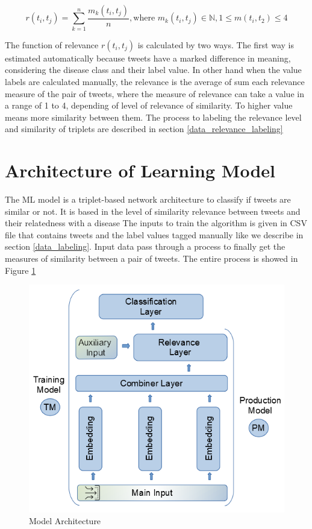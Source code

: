 \documentclass[12pt]{report}
\begin{document}
\begin{equation}
r(t_i, t_j) = \sum^n_{k=1} \frac{m_k(t_i, t_j)}{n}, \text{where } m_k(t_i,t_j) \in \mathbb{N}, 1 \leq m(t_i,t_2) \leq 4
\end{equation}

\noindent The function of relevance $r(t_i, t_j)$ is calculated by two ways. The first way is estimated automatically because tweets have a marked difference in meaning, considering the disease class and their label value. In other hand when the value labels are calculated manually, the relevance is the average of sum each relevance measure of the pair of tweets, where the measure of relevance can take a value in a range of 1 to 4, depending of level of relevance of similarity. To higher value means more similarity between them. The process to labeling the relevance level and similarity of triplets are described in section \ref{data_relevance_labeling}

\section{Architecture of Learning Model}\label{models}

The \ac{ML} model is a triplet-based network architecture \cite {Wang2014} to classify if tweets are similar or not. It is based in the level of similarity relevance between tweets and their relatedness with a disease  The inputs to train the algorithm is given in \ac{CSV} file that contains tweets and the label values tagged manually like we describe in section \ref{data_labeling}. Input data pass through a process to finally get the measures of similarity between a pair of tweets. The entire process is showed in Figure \ref{figure:all_model}

\begin{figure}[H]	
	\centering
	\includegraphics[width=140mm, scale = 1]{images/11_all_model.png}	
	\caption{Model Architecture}	
	\label{figure:all_model}
\end{figure}
\end{document}

